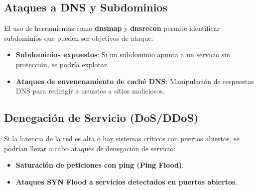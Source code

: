\subsection{Ataques a DNS y Subdominios}
El uso de herramientas como \textbf{dnsmap} y \textbf{dnsrecon} permite identificar subdominios que pueden ser objetivos de ataque:
\begin{itemize}
    \item \textbf{Subdominios expuestos}: Si un subdominio apunta a un servicio sin protección, se podría explotar.
    \item \textbf{Ataques de envenenamiento de caché DNS}: Manipulación de respuestas DNS para redirigir a usuarios a sitios maliciosos.
\end{itemize}

\subsection{Denegación de Servicio (DoS/DDoS)}
Si la latencia de la red es alta o hay sistemas críticos con puertos abiertos, se podrían llevar a cabo ataques de denegación de servicio:
\begin{itemize}
    \item \textbf{Saturación de peticiones con ping (Ping Flood)}.
    \item \textbf{Ataques SYN Flood a servicios detectados en puertos abiertos}.
\end{itemize}